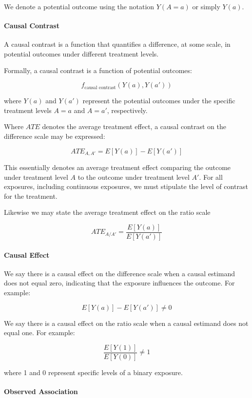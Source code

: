 \documentclass[
  singlecolumn]{article}
\let\oldparagraph\paragraph
\renewcommand{\paragraph}[1]{\oldparagraph{#1}\mbox{}}
\begin{document}
We denote a potential outcome using the notation \(Y(A = a)\) or simply
\(Y(a)\).

\paragraph{\texorpdfstring{\textbf{Causal
Contrast}}{Causal Contrast}}\label{causal-contrast}

A causal contrast is a function that quantifies a difference, at some
scale, in potential outcomes under different treatment levels.

Formally, a causal contrast is a function of potential outcomes:

\[f_{\text{causal contrast}}(Y(a), Y(a'))\]

where \(Y(a)\) and \(Y(a')\) represent the potential outcomes under the
specific treatment levels \(A = a\) and \(A = a'\), respectively.

Where \(ATE\) denotes the average treatment effect, a causal contrast on
the difference scale may be expressed:

\[ATE_{A,A'} = E[Y(a)] - E[Y(a')]\]

This essentially denotes an average treatment effect comparing the
outcome under treatment level \(A\) to the outcome under treatment level
\(A'\). For all exposures, including continuous exposures, we must
stipulate the level of contrast for the treatment.

Likewise we may state the average treatment effect on the ratio scale

\[ATE_{A/A'} = \frac{E[Y(a)]}{E[Y(a')]}\]

\paragraph{\texorpdfstring{\textbf{Causal
Effect}}{Causal Effect}}\label{causal-effect}

We say there is a causal effect on the difference scale when a causal
estimand does not equal zero, indicating that the exposure influences
the outcome. For example:

\[E[Y(a)] - E[Y(a')] \neq 0\]

We say there is a causal effect on the ratio scale when a causal
estimand does not equal one. For example:

\[\frac{E[Y(1)]}{E[Y(0)]}\neq 1\]

where 1 and 0 represent specific levels of a binary exposure.

\paragraph{\texorpdfstring{\textbf{Observed
Association}}{Observed Association}}\label{observed-association}
\end{document}

